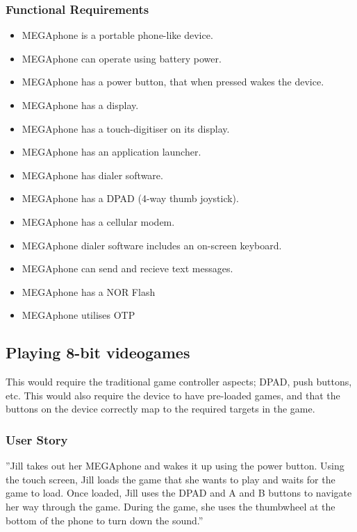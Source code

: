         \subsubsection{Functional Requirements}
        \begin{itemize}
        \item MEGAphone is a portable phone-like device.
        \item MEGAphone can operate using battery power.
        \item MEGAphone has a power button, that when pressed wakes the device.
        \item MEGAphone has a display.
        \item MEGAphone has a touch-digitiser on its display.
        \item MEGAphone has an application launcher.
        \item MEGAphone has dialer software.
        \item MEGAphone has a DPAD (4-way thumb joystick).
        \item MEGAphone has a cellular modem.
	\item MEGAphone dialer software includes an on-screen keyboard.
	\item MEGAphone can send and recieve text messages.
	\item MEGAphone has a NOR Flash
	\item MEGAphone utilises OTP
        \end{itemize}

\subsection{Playing 8-bit videogames}
	This would require the traditional game controller aspects; DPAD, push buttons, etc. This would also require the device to have pre-loaded games, and that the buttons on the device correctly map to the required targets in the game.\\

	\subsubsection{User Story}
	''Jill takes out her MEGAphone and wakes it up using the power button. Using the touch screen, Jill loads the game that she wants to play and waits for the game to load. Once loaded, Jill uses the DPAD and A and B buttons to navigate her way through the game. During the game, she uses the thumbwheel at the bottom of the phone to turn down the sound.''

